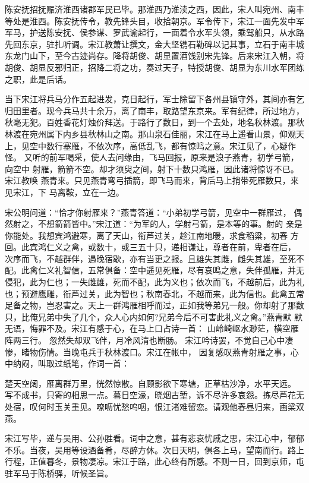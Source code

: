 陈安抚招抚赈济淮西诸郡军民已毕。那淮西乃淮渎之西，因此，宋人叫宛州、南丰
等处是淮西。陈安抚传令，教先锋头目，收拾朝京。军令传下，宋江一面先发中军
军马，护送陈安抚、侯参谋、罗武谕起行，一面着令水军头领，乘驾船只，从水路
先回东京，驻扎听调。宋江教萧让撰文，金大坚镌石勒碑以记其事，立石于南丰城
东龙门山下，至今古迹尚存。降将胡俊、胡显置酒饯别宋先锋。后来宋江入朝，将
胡俊、胡显反邪归正，招降二将之功，奏过天子，特授胡俊、胡显为东川水军团练
之职，此是后话。

当下宋江将兵马分作五起进发，克日起行，军士除留下各州县镇守外，其间亦有乞
归田里者。现今兵马共十余万，离了南丰，取路望东京来。军有纪律，所过地方，
秋毫无犯。百姓香花灯烛价拜送。于路行了数日，到一个去处，地名秋林渡。那秋
林渡在宛州属下内乡县秋林山之南。那山泉石佳丽，宋江在马上遥看山景，仰观天
上，见空中数行塞雁，不依次序，高低乱飞，都有惊鸣之意。宋江见了，心疑作怪。
又听的前军喝采，使人去问缘由，飞马回报，原来是浪子燕青，初学弓箭，向空中
射雁，箭箭不空。却才须臾之间，射下十数只鸿雁，因此诸将惊讶不已。宋江教唤
燕青来。只见燕青弯弓插箭，即飞马而来，背后马上捎带死雁数只，来见宋江，下
马离鞍，立在一边。

宋公明问道：“恰才你射雁来？”燕青答道：“小弟初学弓箭，见空中一群雁过，
偶然射之，不想箭箭皆中。”宋江道：“为军的人，学射弓箭，是本等的事。射的
亲是你能处。我想宾鸿避寒，离了天山，衔芦过关，趁江南地暖，求食稻粱，初春
方回。此宾鸿仁义之禽，或数十，或三五十只，递相谦让，尊者在前，卑者在后，
次序而飞，不越群伴，遇晚宿歇，亦有当更之报。且雄失其雌，雌失其雄，至死不
配。此禽仁义礼智信，五常俱备：空中遥见死雁，尽有哀鸣之意，失伴孤雁，并无
侵犯，此为仁也；一失雌雄，死而不配，此为义也；依次而飞，不越前后，此为礼
也；预避鹰雕，衔芦过关，此为智也；秋南春北，不越而来，此为信也。此禽五常
足备之物，岂忍害之。天上一群鸿雁相呼而过，正如我等弟兄一般。你却射了那数
只，比俺兄弟中失了几个，众人心内如何?兄弟今后不可害此礼义之禽。”燕青默
默无语，悔罪不及。宋江有感于心，在马上口占诗一首：
山岭崎岖水渺茫，横空雁阵两三行。
忽然失却双飞伴，月冷风清也断肠。
宋江吟诗罢，不觉自己心中凄惨，睹物伤情。当晚屯兵于秋林渡口。宋江在帐中，
因复感叹燕青射雁之事，心中纳闷，叫取过纸笔，作词一首：

楚天空阔，雁离群万里，恍然惊散。自顾影欲下寒塘，正草枯沙净，水平天远。
写不成书，只寄的相思一点。暮日空濠，晓烟古堑，诉不尽许多哀怨。拣尽芦花无
处宿，叹何时玉关重见。嘹呖忧愁呜咽，恨江渚难留恋。请观他春昼归来，画梁双
燕。

宋江写毕，递与吴用、公孙胜看。词中之意，甚有悲哀忧戚之思，宋江心中，郁郁
不乐。当夜，吴用等设酒备肴，尽醉方休。次日天明，俱各上马，望南而行。路上
行程，正值暮冬，景物凄凉。宋江于路，此心终有所感。不则一日，回到京师，屯
驻军马于陈桥驿，听候圣旨。

